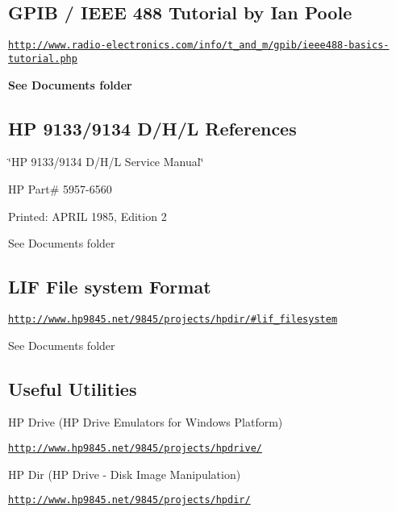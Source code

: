 {\bfseries \subsection*{G\+P\+IB / I\+E\+EE 488 Tutorial by Ian Poole}}

{\bfseries 
\begin{DoxyItemize}
\item \href{http://www.radio-electronics.com/info/t_and_m/gpib/ieee488-basics-tutorial.php}{\tt http\+://www.\+radio-\/electronics.\+com/info/t\+\_\+and\+\_\+m/gpib/ieee488-\/basics-\/tutorial.\+php}
\end{DoxyItemize}}

{\bfseries See Documents folder}

{\bfseries \subsection*{HP 9133/9134 D/\+H/L References}}

{\bfseries 
\begin{DoxyItemize}
\item \char`\"{}\+H\+P 9133/9134 D/\+H/\+L Service Manual\char`\"{}
\item HP Part\# 5957-\/6560
\item Printed\+: A\+P\+R\+IL 1985, Edition 2
\item See Documents folder
\end{DoxyItemize}}

{\bfseries \subsection*{L\+IF File system Format}}

{\bfseries 
\begin{DoxyItemize}
\item \href{http://www.hp9845.net/9845/projects/hpdir/#lif_filesystem}{\tt http\+://www.\+hp9845.\+net/9845/projects/hpdir/\#lif\+\_\+filesystem}
\item See Documents folder
\end{DoxyItemize}}

{\bfseries \subsection*{Useful Utilities}}

{\bfseries 
\begin{DoxyItemize}
\item HP Drive (HP Drive Emulators for Windows Platform)
\begin{DoxyItemize}
\item \href{http://www.hp9845.net/9845/projects/hpdrive/}{\tt http\+://www.\+hp9845.\+net/9845/projects/hpdrive/}
\end{DoxyItemize}
\item HP Dir (HP Drive -\/ Disk Image Manipulation)
\begin{DoxyItemize}
\item \href{http://www.hp9845.net/9845/projects/hpdir/}{\tt http\+://www.\+hp9845.\+net/9845/projects/hpdir/}
\end{DoxyItemize}
\end{DoxyItemize}}

